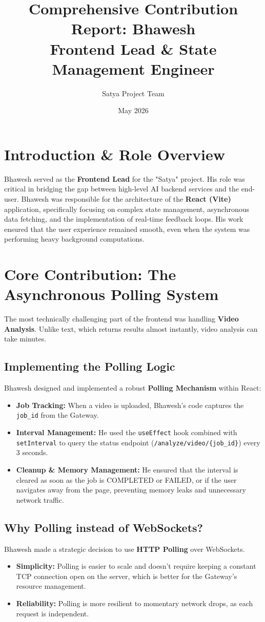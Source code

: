 \documentclass[12pt]{article}
\title{\textbf{Comprehensive Contribution Report: Bhawesh \\ Frontend Lead \& State Management Engineer}}
\author{Satya Project Team}
\date{May 2026}
\begin{document}
\maketitle

\section{Introduction \& Role Overview}
Bhawesh served as the \textbf{Frontend Lead} for the "Satya" project. His role was critical in bridging the gap between high-level AI backend services and the end-user. Bhawesh was responsible for the architecture of the \textbf{React (Vite)} application, specifically focusing on complex state management, asynchronous data fetching, and the implementation of real-time feedback loops. His work ensured that the user experience remained smooth, even when the system was performing heavy background computations.

\section{Core Contribution: The Asynchronous Polling System}
The most technically challenging part of the frontend was handling \textbf{Video Analysis}. Unlike text, which returns results almost instantly, video analysis can take minutes. 

\subsection{Implementing the Polling Logic}
Bhawesh designed and implemented a robust \textbf{Polling Mechanism} within React:
\begin{itemize}
    \item \textbf{Job Tracking:} When a video is uploaded, Bhawesh's code captures the \texttt{job\_id} from the Gateway.
    \item \textbf{Interval Management:} He used the \texttt{useEffect} hook combined with \texttt{setInterval} to query the status endpoint (\texttt{/analyze/video/\{job\_id\}}) every 3 seconds.
    \item \textbf{Cleanup & Memory Management:} He ensured that the interval is cleared as soon as the job is COMPLETED or FAILED, or if the user navigates away from the page, preventing memory leaks and unnecessary network traffic.
\end{itemize}

\subsection{Why Polling instead of WebSockets?}
Bhawesh made a strategic decision to use \textbf{HTTP Polling} over WebSockets. 
\begin{itemize}
    \item \textbf{Simplicity:} Polling is easier to scale and doesn't require keeping a constant TCP connection open on the server, which is better for the Gateway's resource management.
    \item \textbf{Reliability:} Polling is more resilient to momentary network drops, as each request is independent.
\end{itemize}
\end{document}
